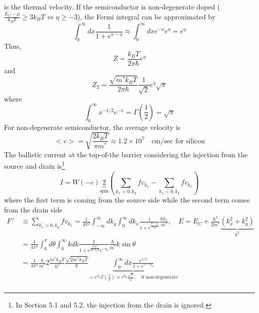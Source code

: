\begin{equation}
\end{equation} is the thermal velocity. If the semiconductor is non-degenerate doped ($\frac{E_{C}-\mu}{k_{B}T}\geq 3k_{B}T\Leftrightarrow \eta\geq -3$), the Fermi integral can be approximated by \begin{equation}
    \int_{0}^{\infty}dx\frac{1}{1+e^{x-\eta}}\approx\int_{0}^{\infty}dxe^{-x}e^{\eta} = e^{\eta}
\end{equation} Thus, \begin{equation}
    Z = \frac{k_{B}T}{2\pi\hbar}e^{\eta}
\end{equation} and \begin{equation}
    Z_{2} = \frac{\sqrt{m^{*}k_{B}T}}{2\pi\hbar}\frac{1}{\sqrt{2}}e^{\eta}\sqrt{\pi}
\end{equation} where \begin{equation}
    \int_{0}^{\infty}x^{-1/2}e^{-x} = \Gamma\left(\frac{1}{2}\right) = \sqrt{\pi}
\end{equation} For non-degenerate semiconductor, the average velocity is \begin{equation}
    \big<v\big> = \sqrt{\frac{2k_{B}T}{\pi m^{*}}} \approx 1.2\times10^7 \quad\text{cm/sec for silicon}
\end{equation} The ballistic current at the top-of-the barrier considering the injection from the source and drain is\footnote{In Section 5.1 and 5.2, the injection from the drain is ignored.} \begin{equation}
    I = W(-e)\underbrace{2}_{\text{spin}}\left(\sum_{k_{x}>0,k_{y}}{fv_{k_{x}}}-\sum_{k_{x}<0,k_{y}}{fv_{k_{x}}}\right)
\end{equation} where the first term is coming from the source side while the second term comes from the drain side \begin{align}
    F^{+}& \equiv \sum_{k_{x}>0,k_{y}}{fv_{k_{x}}} = \frac{1}{4\pi^{2}}\int_{-\infty}^{\infty}dk_{y}\int_{0}^{\infty}dk_{x}\frac{1}{1+e^{\frac{E-\mu_{S}}{k_{B}T}}}\frac{\hbar k_{x}}{m^{*}},\quad E=E_{C}+\frac{\hbar^{2}}{2m^{*}}\underbrace{\left(k_{x}^{2}+k_{y}^{2}\right)}_{k^{2}}\nonumber\\
    & = \frac{1}{4\pi^{2}}\int_{0}^{\pi}d\theta\int_{0}^{\infty}kdk\frac{1}{1+e^{\frac{\hbar^{2}k^{2}}{2m^{*}k_{B}T}}e^{-\eta_{S}}}\frac{\hbar}{m^{*}}k\sin{\theta}\nonumber\\
    & = \frac{1}{4\pi^{2}}\frac{\hbar}{m^{*}}2\frac{m^{*}k_{B}T}{\hbar^{2}}\frac{\sqrt{2m^{*}k_{B}T}}{\hbar}\underbrace{\int_{0}^{\infty}dx\frac{x^{1/2}}{1+e^{x-\eta_{S}}}}_{=e^{\eta_{S}}\Gamma(\frac{3}{2})\approx e^{\eta_{S}}\frac{\sqrt{\pi}}{2},\quad\text{if non-degenerate}}\nonumber\\

\end{align}
